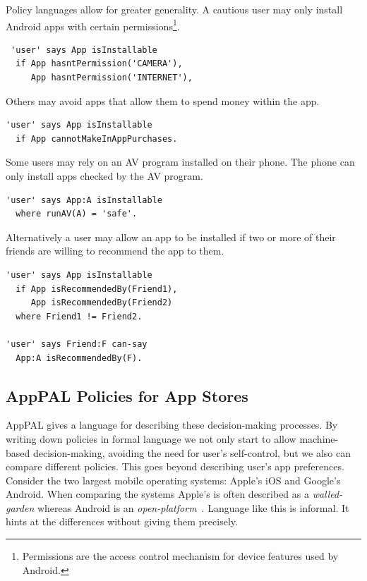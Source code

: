 \documentclass[thesis.tex]{subfiles}
\begin{document}
Policy languages allow for greater generality.  A cautious user may
only install Android apps with certain
permissions\footnote{Permissions are the access control mechanism for
  device features used by Android.}.
\begin{lstlisting} 'user' says App isInstallable
  if App hasntPermission('CAMERA'),
     App hasntPermission('INTERNET'),
\end{lstlisting}
Others may avoid apps that allow them to spend money within the app.
\begin{lstlisting}
'user' says App isInstallable
  if App cannotMakeInAppPurchases.
\end{lstlisting}
Some users may rely on an \ac{AV} program installed on their phone.
The phone can only install apps checked by the \ac{AV} program.
\begin{lstlisting}
'user' says App:A isInstallable
  where runAV(A) = 'safe'.
\end{lstlisting}
Alternatively a user may allow an app to be installed if two or more of their friends are willing to recommend the app to them.
\begin{lstlisting}
'user' says App isInstallable
  if App isRecommendedBy(Friend1),
     App isRecommendedBy(Friend2)
  where Friend1 != Friend2.

'user' says Friend:F can-say
  App:A isRecommendedBy(F).
\end{lstlisting}


\subsection{AppPAL Policies for App Stores}
AppPAL gives a language for describing these decision-making processes. By
writing down policies in formal language we not only start to allow
machine-based decision-making, avoiding the need for user's self-control, but we
also can compare different policies. This goes beyond describing user's app
preferences. Consider the two largest mobile operating systems: Apple's iOS and
Google's Android. When comparing the systems Apple's is often described as a
\emph{walled-garden} whereas Android is an
\emph{open-platform}~\cite{barrera_secure_2011,enck_defending_2011}. Language
like this is informal. It hints at the differences without giving them
precisely.
\end{document}
